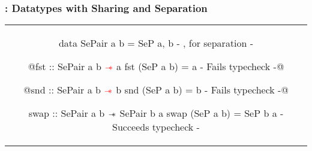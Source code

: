 \begin{frame}[fragile, c]
  \frametitle{\qub{}: Datatypes with Sharing and Separation}
  \begin{center}
       \begin{tabular}[c]{c}
          \begin{haskell}
data SePair a b = SeP a, b     {- , for separation -}

@fst :: SePair a b ${\color{red}\mathrel{-\mkern-6mu*}}$ a
fst (SeP a b) = a              {- Fails typecheck -}@

@snd :: SePair a b ${\color{red}\mathrel{-\mkern-6mu*}}$ b
snd (SeP a b) = b              {- Fails typecheck -}@

swap :: SePair a b $\mathrel{-\mkern-6mu*}$ SePair b a
swap (SeP a b) = SeP b a       {- Succeeds typecheck -}
          \end{haskell}
        \end{tabular}
  \end{center}
\end{frame}

